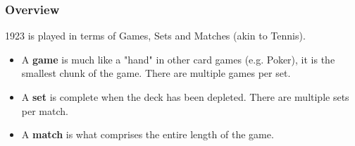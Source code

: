 \documentclass[11pt]{article}
\begin{document}
\subsubsection{Overview}
\label{sec-2-2-1}
1923 is played in terms of Games, Sets and Matches (akin to Tennis).  

\begin{itemize}
\item A \textbf{game} is much like a "hand" in other card games (e.g. Poker), it is
the smallest chunk of the game. There are multiple games per set.
\item A \textbf{set} is complete when the deck has been depleted. There are
multiple sets per match.
\item A \textbf{match} is what comprises the entire length of the game.
\end{itemize}
\end{document}
